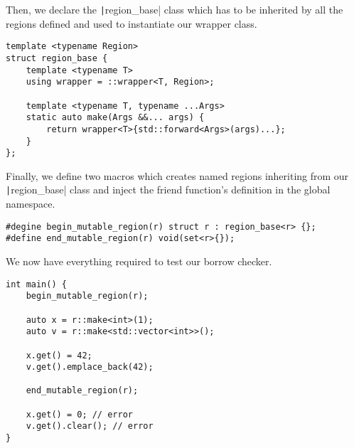 Then, we declare the \texttt|region_base| class which has to be inherited by all the regions defined and used to instantiate our wrapper class.

\begin{verbatim}
template <typename Region>
struct region_base {
    template <typename T>
    using wrapper = ::wrapper<T, Region>;

    template <typename T, typename ...Args>
    static auto make(Args &&... args) {
        return wrapper<T>{std::forward<Args>(args)...};
    }
};
\end{verbatim}

Finally, we define two macros which creates named regions inheriting from our \texttt|region_base| class and inject the friend function's definition in the global namespace. \\

\begin{verbatim}
#degine begin_mutable_region(r) struct r : region_base<r> {};
#define end_mutable_region(r) void(set<r>{});
\end{verbatim}

We now have everything required to test our borrow checker.
\begin{verbatim}
int main() {
    begin_mutable_region(r);

    auto x = r::make<int>(1);
    auto v = r::make<std::vector<int>>();

    x.get() = 42;
    v.get().emplace_back(42);

    end_mutable_region(r);

    x.get() = 0; // error
    v.get().clear(); // error
}
\end{verbatim}

\hrulefill

